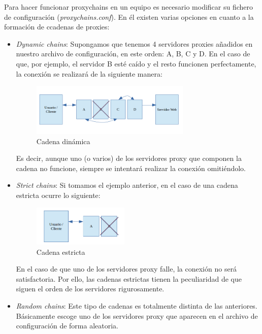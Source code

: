 Para hacer funcionar proxychains en un equipo es necesario modificar su fichero de configuración (\textit{proxychains.conf}). En él existen varias opciones en cuanto a la formación de ccadenas de proxies:

\begin{itemize}
	\item \textit{Dynamic chains}: Supongamos que tenemos 4 servidores proxies añadidos en nuestro archivo de configuración, en este orden: A, B, C y D.
	En el caso de que, por ejemplo, el servidor B esté caído y el resto funcionen perfectamente, la conexión se realizará de la siguiente manera:
	
	\begin{figure}[h]
		\centerline{
			\mbox{\includegraphics[width=3.00in]{images/proxy_dynamic.png}}
		}
		\caption{Cadena dinámica}
		\label{fig:dyn_chain}
	\end{figure}
		
	Es decir, aunque uno (o varios) de los servidores proxy que componen la cadena no funcione, siempre se intentará realizar la conexión omitiéndolo.
	
	\item \textit{Strict chains}: Si tomamos el ejemplo anterior, en el caso de una cadena estricta ocurre lo siguiente:
	
	\begin{figure}[h]
		\centerline{
			\mbox{\includegraphics[width=1.80in]{images/proxy_strict.png}}
		}
		\caption{Cadena estricta}
		\label{fig:strict_chain}
	\end{figure}
			
	En el caso de que uno de los servidores proxy falle, la conexión no será satisfactoria. Por ello, las cadenas estrictas tienen la peculiaridad de que siguen el orden de los servidores rigurosamente.
	
	\item \textit{Random chains}: Este tipo de cadenas es totalmente distinta de las anteriores. Básicamente escoge uno de los servidores proxy que aparecen en el archivo de configuración de forma aleatoria.
\end{itemize}

